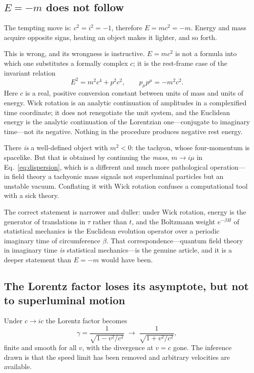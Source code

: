 \documentclass[twocolumn,floatfix,aps,prd,nofootinbib]{revtex4-2}
\begin{document}
\subsection{$E=-m$ does not follow}
\label{sec:emc2}

The tempting move is: $c^2=i^2=-1$, therefore $E=mc^2=-m$. Energy and mass acquire opposite signs, heating an object makes it lighter, and so forth.

This is wrong, and its wrongness is instructive. $E=mc^2$ is not a formula into which one substitutes a formally complex $c$; it is the rest-frame case of the invariant relation
\begin{equation}
E^2=m^2c^4+p^2c^2 ,\qquad p_\mu p^\mu=-m^2c^2 .
\label{eq:dispersion}
\end{equation}
Here $c$ is a real, positive conversion constant between units of mass and units of energy. Wick rotation is an analytic continuation of amplitudes in a complexified time coordinate; it does not renegotiate the unit system, and the Euclidean energy is the analytic continuation of the Lorentzian one---conjugate to imaginary time---not its negative. Nothing in the procedure produces negative rest energy.

There \emph{is} a well-defined object with $m^2<0$: the tachyon, whose four-momentum is spacelike. But that is obtained by continuing the \emph{mass}, $m\to i\mu$ in Eq.~\eqref{eq:dispersion}, which is a different and much more pathological operation---in field theory a tachyonic mass signals not superluminal particles but an unstable vacuum. Conflating it with Wick rotation confuses a computational tool with a sick theory.

The correct statement is narrower and duller: under Wick rotation, energy is the generator of translations in $\tau$ rather than $t$, and the Boltzmann weight $e^{-\beta H}$ of statistical mechanics is the Euclidean evolution operator over a periodic imaginary time of circumference $\beta$. That correspondence---quantum field theory in imaginary time \emph{is} statistical mechanics---is the genuine article, and it is a deeper statement than $E=-m$ would have been.

\subsection{The Lorentz factor loses its asymptote, but not to superluminal motion}
\label{sec:gamma}

Under $c\to ic$ the Lorentz factor becomes
\begin{equation}
\gamma=\frac{1}{\sqrt{1-v^2/c^2}}\;\longrightarrow\;\frac{1}{\sqrt{1+v^2/c^2}} ,
\label{eq:gamma}
\end{equation}
finite and smooth for all $v$, with the divergence at $v=c$ gone. The inference drawn is that the speed limit has been removed and arbitrary velocities are available.
\end{document}

